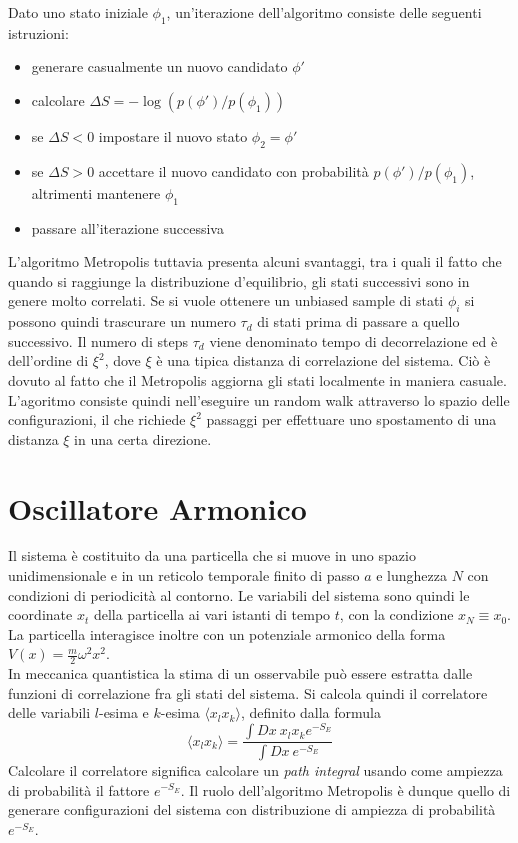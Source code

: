 Dato uno stato iniziale $\phi_1$, un'iterazione dell'algoritmo consiste delle seguenti istruzioni:
\begin{itemize}
    \item generare casualmente un nuovo candidato $\phi'$
    \item calcolare $\Delta S = -\log(p(\phi')/p(\phi_1))$
    \item se $\Delta S < 0$ impostare il nuovo stato $\phi_2=\phi'$
    \item se $\Delta S > 0$ accettare il nuovo candidato con probabilità $p(\phi')/p(\phi_1)$, altrimenti mantenere $\phi_1$
    \item passare all'iterazione successiva
\end{itemize}
L'algoritmo Metropolis tuttavia presenta alcuni svantaggi, tra i quali il fatto che quando si raggiunge la distribuzione d'equilibrio, gli stati successivi sono in genere molto correlati. Se si vuole ottenere un unbiased sample di stati $\phi_i$ si possono quindi trascurare un numero $\tau_d$ di stati prima di passare a quello successivo. Il numero di steps $\tau_d$ viene denominato tempo di decorrelazione ed è dell'ordine di $\xi^2$, dove $\xi$ è una tipica distanza di correlazione del sistema. Ciò è dovuto al fatto che il Metropolis aggiorna gli stati localmente in maniera casuale. L'agoritmo consiste quindi nell'eseguire un random walk attraverso lo spazio delle configurazioni, il che richiede $\xi^2$ passaggi per effettuare uno spostamento di una distanza $\xi$ in una certa direzione.

\section{Oscillatore Armonico}
Il sistema è costituito da una particella che si muove in uno spazio unidimensionale e in un reticolo temporale finito di passo $a$ e lunghezza $N$ con condizioni di periodicità al contorno. Le variabili del sistema sono quindi le coordinate $x_t$ della particella ai vari istanti di tempo $t$, con la condizione $x_N \equiv x_0$. La particella interagisce inoltre con un potenziale armonico della forma $V(x) = \frac{m}{2}\omega^2 x^2$.
\\

In meccanica quantistica la stima di un osservabile può essere estratta dalle funzioni di correlazione fra gli stati del sistema.
Si calcola quindi il correlatore delle variabili $l$-esima e $k$-esima $\langle x_lx_k\rangle$, definito dalla formula
$$\langle x_lx_k\rangle=\frac{\int Dx\ x_lx_ke^{-S_E}}{\int Dx\ e^{-S_E}}$$
Calcolare il correlatore significa calcolare un \textit{path integral} usando come ampiezza di probabilità il fattore $e^{-S_E}$. Il ruolo dell'algoritmo Metropolis è dunque quello di generare configurazioni del sistema con distribuzione di ampiezza di probabilità $e^{-S_E}$.
\\

